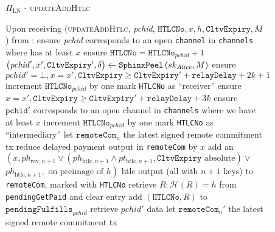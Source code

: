   \begin{figure}[H]
    \begin{protocolbox}{$\Pi_{\mathrm{LN}}$ - \textsc{updateAddHtlc}}
      \begin{algorithmic}[1]
        \State Upon receiving (\textsc{updateAddHtlc}, \textit{pchid},
        $\mathtt{HTLCNo}, x, h, \mathtt{CltvExpiry}, M$) from \bob:
        \Indent
          \State ensure \textit{pchid} corresponds to an open \texttt{channel}
          in \texttt{channels} where \bob{} has at least $x$
          \State ensure $\mathtt{HTLCNo} = \mathtt{HTLCNo}_{\mathit{pchid}} + 1$
          \State $\left(\mathit{pchid}', x', \mathtt{CltvExpiry}',
          \delta\right) \gets \mathtt{SphinxPeel}\left(sk_{\mathit{Alice}}, M\right)$
            \State ensure $\mathit{pchid}' = \bot, x = x', \mathtt{CltvExpiry}
            \geq \mathtt{CltvExpiry}' + \mathtt{relayDelay} + 2k + 1$
            \State increment $\mathtt{HTLCNo}_{\mathit{pchid}}$ by one
            \State mark \texttt{HTLCNo} as ``receiver''
          \Else {}
            \State ensure $x = x', \mathtt{CltvExpiry} \geq \mathtt{CltvExpiry}'
            + \mathtt{relayDelay} + 3k$
            \State ensure $\mathtt{pchid}'$ corresponds to an open channel in
            \texttt{channels} where we have at least $x$
            \State increment $\mathtt{HTLCNo}_{\mathit{pchid}}$ by one
            \State mark \texttt{HTLCNo} as ``intermediary''
          \EndIf
          \State let $\mathtt{remoteCom}_n$ the latest signed remote commitment
          tx
          \State reduce delayed payment output in \texttt{remoteCom} by $x$
          \State add an $\left(x, ph_{\mathrm{rev}, n+1} \vee
          \left(ph_{\mathrm{htlc}, n+1} \wedge pt_{\mathrm{htlc}, n+1},
          \mathtt{CltvExpiry} \text{ absolute}\right) \vee\right.$
          $\left.ph_{\mathrm{htlc}, n+1}, \text{ on preimage of } h\right)$ htlc
          output (all with $n+1$ keys) to \texttt{remoteCom}, marked with
          \texttt{HTLCNo}
            \State retrieve $R : \mathcal{H}\left(R\right) = h$ from
            \texttt{pendingGetPaid} and clear entry
            \State add $\left(\mathtt{HTLCNo}, R\right)$ to
            $\mathtt{pendingFulfills}_{\mathit{pchid}}$
           
            \State retrieve $\mathit{pchid}'$ data
            \State let $\mathtt{remoteCom}_n'$ the latest signed remote
            commitment tx

\end{algorithmic}
\end{protocolbox}
\end{figure}
